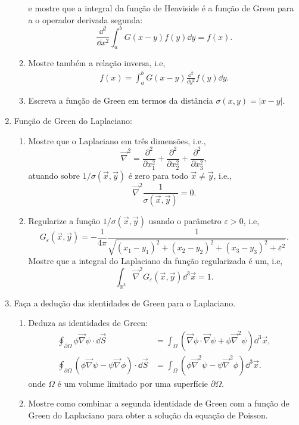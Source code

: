 \begin{enumerate}
\begin{enumerate}
		            e mostre que a integral da função de Heaviside é a função de Green
		            para a o operador derivada segunda:
		            $$\frac{\dd^2}{\dd x^2}\int_{a}^{b}G(x-y)f(y)\dd y = f(x).$$
		      \item Mostre também a relação inversa, i.e,
		            \begin{align}
			            f(x) = \int_{a}^{b}G(x-y)\frac{\dd^2}{\dd y^2}f(y)\dd y.
		            \end{align}
		      \item Escreva a função de Green em termos da distância $\sigma(x,y) = |x-y|$.
	      \end{enumerate}
	\item Função de Green do Laplaciano:
	      \begin{enumerate}
		      \item Mostre que o Laplaciano em três dimensões, i.e.,
		            $$\vec\nabla^2 = \frac{\partial^2}{\partial x_1^2}+\frac{\partial^2}{\partial x_2^2}+\frac{\partial^2}{\partial x_3^2},$$
		            atuando sobre $1/\sigma(\vec{x},\vec{y})$ é zero para todo $\vec{x}\neq\vec{y}$, i.e.,
		            $$\vec\nabla^2\frac{1}{\sigma(\vec{x},\vec{y})} = 0.$$
		      \item Regularize a função $1/\sigma(\vec{x},\vec{y})$ usando
		            o parâmetro $\varepsilon>0$, i.e,
		            $$G_\varepsilon(\vec{x},\vec{y}) = -\frac{1}{4\pi}\frac{1}{\sqrt{(x_1-y_1)^2+(x_2-y_2)^2+(x_3-y_3)^2+\varepsilon^2}}.$$
		            Mostre que a integral do Laplaciano da função regularizada é um, i.e,
		            $$\int_{\mathbb{R}^3}\vec\nabla^2G_\varepsilon(\vec{x},\vec{y})\dd^3\vec{x} = 1.$$
	      \end{enumerate}
	\item Faça a dedução das identidades de Green para o Laplaciano.
	      \begin{enumerate}
		      \item Deduza as identidades de Green:
		            \begin{align}
			            \oint_{\partial\Omega}\phi\vec\nabla\psi\cdot\dd\vec{S}                                 & =
			            \int_{\Omega}\left(\vec\nabla\phi\cdot\vec\nabla\psi+\phi\vec\nabla^2\psi\right)\dd^3\vec{x}, \\
			            \oint_{\partial\Omega}\left(\phi\vec\nabla\psi-\psi\vec\nabla\phi\right)\cdot\dd\vec{S} & =
			            \int_{\Omega}\left(\phi\vec\nabla^2\psi-\psi\vec\nabla^2\phi\right)\dd^3\vec{x}.
		            \end{align}
		            onde $\Omega$ é um volume limitado por uma superfície $\partial\Omega$.
		      \item Mostre como combinar a segunda identidade de Green com a função de
		            Green do Laplaciano para obter a solução da equação de Poisson.
	      \end{enumerate}
\end{enumerate}

